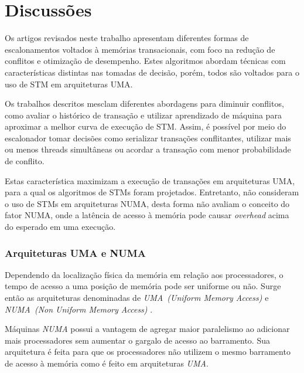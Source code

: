 \documentclass[ti]{texufpel}
\begin{document}
\chapter{Discussões}

Os artigos revisados neste trabalho apresentam diferentes formas de escalonamentos voltados à memórias transacionais, com foco na redução de conflitos e otimização de desempenho. Estes algoritmos abordam técnicas com características distintas nas tomadas de decisão, porém, todos são voltados para o uso de STM em arquiteturas UMA.

Os trabalhos descritos mesclam diferentes abordagens para diminuir conflitos, como avaliar o histórico de transação e utilizar aprendizado de máquina para aproximar a melhor curva de execução de STM. Assim, é possível por meio do escalonador tomar decisões como serializar transações conflitantes, utilizar mais ou menos threads simultâneas ou acordar a transação com menor probabilidade de conflito.

Estas característica maximizam a execução de transações em arquiteturas UMA, para a qual os algoritmos de STMs foram projetados. Entretanto, não consideram o uso de STMs em arquiteturas NUMA, desta forma não avaliam o conceito do fator NUMA, onde a latência de acesso à memória pode causar \emph{overhead} acima do esperado em uma execução.


\subsection{Arquiteturas UMA e NUMA}

Dependendo da localização física da memória em relação aos processadores, o tempo de acesso a uma posição de memória pode ser uniforme ou não. Surge então as arquiteturas denominadas de \emph{UMA~(Uniform Memory Access)} e \emph{NUMA~(Non Uniform Memory Access)} \cite{carissimi07}.

Máquinas \emph{NUMA} possui a vantagem de agregar maior paralelismo ao adicionar mais processadores sem aumentar o gargalo de acesso ao barramento. Sua arquitetura é feita para que os processadores não utilizem o mesmo barramento de acesso à memória como é feito em arquiteturas \emph{UMA}.
\end{document}
